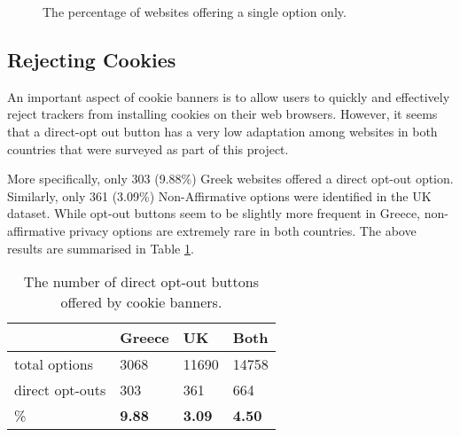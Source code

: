 \documentclass[../main.tex]{subfiles}
\begin{document}
\begin{figure}[ht]
    \centering
    \caption{The percentage of websites offering a single option only.}
    \label{fig:single_options}
\end{figure}

\subsection{Rejecting Cookies}

An important aspect of cookie banners is to allow users to quickly and effectively reject trackers from installing cookies on their web browsers. However, it seems that a direct-opt out button has a very low adaptation among websites in both countries that were surveyed as part of this project.

More specifically, only 303 (9.88\%) Greek websites offered a direct opt-out option. Similarly, only 361 (3.09\%) Non-Affirmative options were identified in the UK dataset. While opt-out buttons seem to be slightly more frequent in Greece, non-affirmative privacy options are extremely rare in both countries. The above results are summarised in Table \ref{tab:opt_outs}.

\begin{table}[ht]
    \centering
    \begin{tabular}{@{}llll@{}}
        \toprule
                              & Greece          & UK                & Both            \\ \midrule
        total options         & 3068            & 11690             & 14758           \\
        direct opt-outs & 303             & 361               & 664             \\
        \%                    & \textbf{9.88}  & \textbf{3.09}    & \textbf{4.50}  \\ \bottomrule
    \end{tabular}
    \caption{The number of direct opt-out buttons offered by cookie banners.}
    \label{tab:opt_outs}
\end{table}
\end{document}
